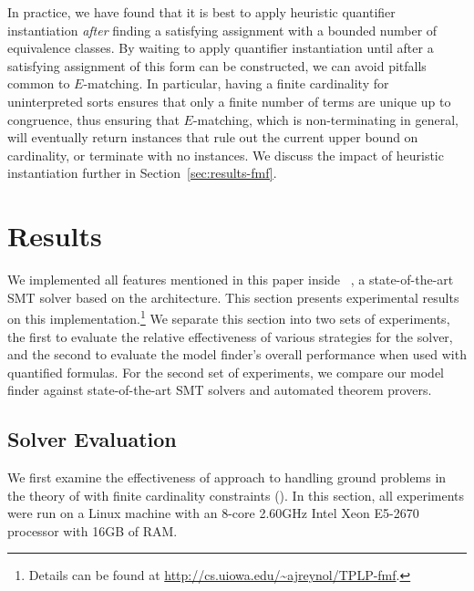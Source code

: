 \documentclass{svjour3}                     %
\begin{document}
In practice, we have found that it is best to apply
heuristic quantifier instantiation \emph{after} finding 
a satisfying assignment with a bounded number of equivalence classes.
By waiting to apply quantifier instantiation until after a satisfying assignment of this form can be constructed, 
we can avoid pitfalls common to $E$-matching.
In particular, having a finite cardinality for uninterpreted sorts ensures
that only a finite number of terms are unique up to congruence, 
thus ensuring that $E$-matching, which is non-terminating in general,
will eventually return instances that rule out the current upper bound on cardinality,
or terminate with no instances.
We discuss the impact of heuristic instantiation further in Section~\ref{sec:results-fmf}.

\section{Results}
\label{sec:results}

We implemented all features mentioned in this paper inside \cvc~\cite{CVC4-CAV-11},
a state-of-the-art SMT solver based on the \dpllts architecture.
This section presents experimental results on this implementation.\footnote{%
Details can be found at {\url{http://cs.uiowa.edu/~ajreynol/TPLP-fmf}}.
}
We separate this section into two sets of experiments, 
the first to evaluate the relative effectiveness of various strategies 
for the \fcc solver, and 
the second to evaluate the model finder's overall performance  
when used with quantified formulas. 
For the second set of experiments, we compare our model finder against 
state-of-the-art SMT solvers and automated theorem provers.

\subsection{\fcc Solver Evaluation}

We first examine the effectiveness of approach to handling ground 
problems in the theory of \euf with finite cardinality constraints (\fcc).
In this section, all experiments were run on a Linux machine with an 8-core 2.60GHz 
Intel\textsuperscript{\textregistered} Xeon\textsuperscript{\textregistered} E5-2670 processor with 16GB of RAM.
\end{document}
